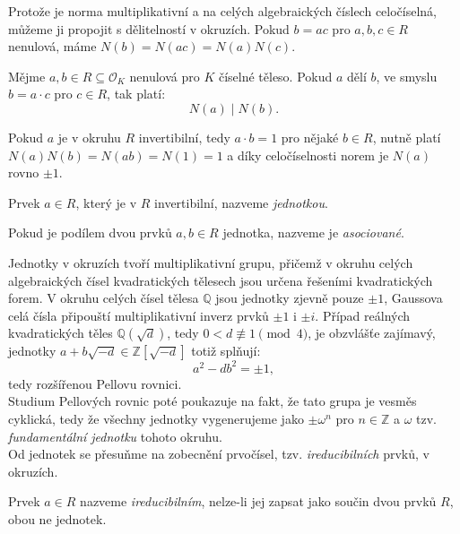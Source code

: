 \documentclass [12pt]{report}
\begin{document}
Protože je norma multiplikativní a na celých algebraických číslech celočíselná, můžeme ji propojit s dělitelností v okruzích. Pokud $b = ac$ pro $a,b,c \in R$ nenulová, máme $N(b) = N(ac) = N(a)N(c)$.
\begin{veta}\label{normalni}
Mějme $a,b \in R \subseteq \mathcal{O}_K$ nenulová pro $K$ číselné těleso. Pokud $a$ dělí $b$, ve smyslu $b = a \cdot c$ pro $c \in R$, tak platí:
\begin{equation*}
N(a) \mid N(b).
\end{equation*}
\end{veta}

Pokud $a$ je v okruhu $R$ invertibilní, tedy $a\cdot b = 1$ pro nějaké $b \in R$, nutně platí $N(a)N(b) = N(ab) = N(1) = 1$ a díky celočíselnosti norem je $N(a)$ rovno $\pm 1$. 
\begin{definice}
Prvek $a \in R$, který je v $R$ invertibilní, nazveme \textit{jednotkou}.
\end{definice}

\begin{definice}
Pokud je podílem dvou prvků $a,b \in R$ jednotka, nazveme je \textit{asociované}.
\end{definice}

Jednotky v okruzích tvoří multiplikativní grupu, přičemž v okruhu celých algebraických čísel kvadratických tělesech jsou určena řešeními kvadratických forem. V okruhu celých čísel tělesa $\mathbb{Q}$ jsou jednotky zjevně pouze $\pm 1$, Gaussova celá čísla připouští multiplikativní inverz prvků $\pm 1$ i $\pm i$. Případ reálných kvadratických těles $\mathbb{Q}(\sqrt{d})$, tedy $0 < d \not\equiv 1 \pmod{4}$, je obzvlášťe zajímavý, jednotky $a+b\sqrt{-d} \in \mathbb{Z}[\sqrt{-d}]$ totiž splňují:
\begin{equation*}
a^2 - d b^2 = \pm 1,
\end{equation*}
tedy rozšířenou Pellovu rovnici.\\

Studium Pellových rovnic \cite{Prase} poté poukazuje na fakt, že tato grupa je vesměs cyklická, tedy že všechny jednotky vygenerujeme jako $\pm \omega^n$ pro $n \in \mathbb{Z}$ a $\omega$ tzv. \textit{fundamentální jednotku} tohoto okruhu.\\

Od jednotek se přesuňme na zobecnění prvočísel, tzv. \textit{ireducibilních} prvků, v okruzích. 
\begin{definice}
Prvek $a \in R$ nazveme \textit{ireducibilním}, nelze-li jej zapsat jako součin dvou prvků $R$, obou ne jednotek.
\end{definice}
\end{document}
